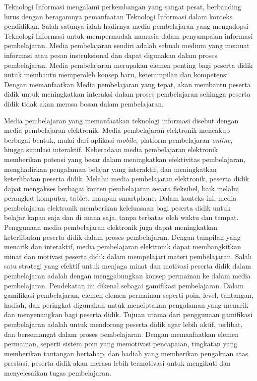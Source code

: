 Teknologi Informasi mengalami perkembangan yang sangat pesat, berbanding lurus dengan beragamnya pemanfaatan Teknologi Informasi dalam konteks pendidikan.
Salah satunya ialah hadirnya media pembelajaran yang mengadopsi Teknologi Informasi untuk mempermudah manusia dalam penyampaian informasi pembelajaran.
Media pembelajaran sendiri adalah sebuah medium yang memuat informasi atau pesan instruksional dan dapat digunakan dalam proses pembelajaran.
Media pembelajaran merupakan elemen penting bagi peserta didik untuk membantu memperoleh konsep baru, keterampilan dan kompetensi.
Dengan memanfaatkan Media pembelajaran yang tepat, akan membantu peserta didik untuk meningkatkan interaksi dalam proses pembelajaran 
sehingga peserta didik tidak akan merasa bosan dalam pembelajaran\cite{hasan2021media}.

Media pembelajaran yang memanfaatkan teknologi informasi disebut dengan media pembelajaran elektronik.
Media pembelajaran elektronik mencakup berbagai bentuk, mulai dari aplikasi \textit{mobile}, platform pembelajaran \textit{online}, hingga simulasi interaktif. 
Keberadaan media pembelajaran elektronik memberikan potensi yang besar dalam meningkatkan efektivitas pembelajaran, menghadirkan pengalaman belajar yang interaktif, dan meningkatkan keterlibatan peserta didik.
Melalui media pembelajaran elektronik, peserta didik dapat mengakses berbagai konten pembelajaran secara fleksibel, baik melalui perangkat komputer, tablet, maupun smartphone.
Dalam konteks ini, media pembelajaran elektronik memberikan keleluasaan bagi peserta didik untuk belajar kapan saja dan di mana saja, tanpa terbatas oleh waktu dan tempat\cite{haryadi2021pengaruh}. 
Penggunaan media pembelajaran elektronik juga dapat meningkatkan keterlibatan peserta didik dalam proses pembelajaran.
Dengan tampilan yang menarik dan interaktif, media pembelajaran elektronik dapat membangkitkan minat dan motivasi peserta didik dalam mempelajari materi pembelajaran. 
Salah satu strategi yang efektif untuk menjaga minat dan motivasi peserta didik dalam pembelajaran adalah dengan menggabungkan konsep permainan ke dalam media pembelajaran.
Pendekatan ini dikenal sebagai gamifikasi pembelajaran. Dalam gamifikasi pembelajaran, elemen-elemen permainan seperti poin, level, tantangan, hadiah, dan peringkat digunakan untuk menciptakan pengalaman yang menarik dan menyenangkan bagi peserta didik.
Tujuan utama dari penggunaan gamifikasi pembelajaran adalah untuk mendorong peserta didik agar lebih aktif, terlibat, dan bersemangat dalam proses pembelajaran.
Dengan memanfaatkan elemen permainan, seperti sistem poin yang memotivasi pencapaian, tingkatan yang memberikan tantangan bertahap, dan hadiah yang memberikan pengakuan atas prestasi, peserta didik akan merasa lebih termotivasi untuk mengikuti dan menyelesaikan tugas pembelajaran\cite{schell2008art}.


